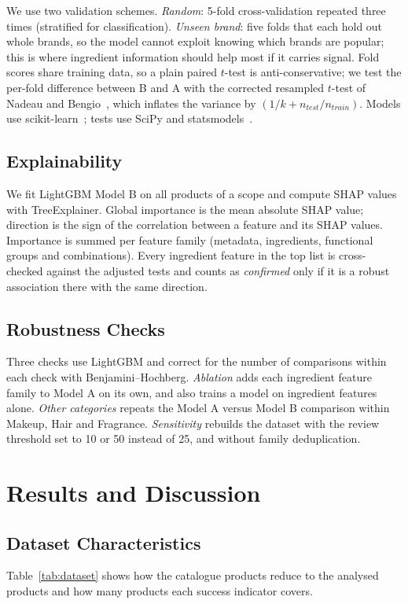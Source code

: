 \documentclass[11pt,a4paper]{article}
\newcommand{\draft}[1]{{\color{blue!70!black}#1}}
\begin{document}
We use two validation schemes. \emph{Random}: 5-fold cross-validation repeated three times (stratified for classification). \emph{Unseen brand}: five folds that each hold out whole brands, so the model cannot exploit knowing which brands are popular; this is where ingredient information should help most if it carries signal. Fold scores share training data, so a plain paired $t$-test is anti-conservative; we test the per-fold difference between B and A with the corrected resampled $t$-test of Nadeau and Bengio~\cite{nadeau2003}, which inflates the variance by $(1/k + n_{test}/n_{train})$. Models use scikit-learn~\cite{pedregosa2011sklearn}; tests use SciPy and statsmodels~\cite{seabold2010statsmodels}.

\subsection{Explainability}
We fit LightGBM Model B on all products of a scope and compute SHAP values~\cite{lundberg2017shap} with TreeExplainer. Global importance is the mean absolute SHAP value; direction is the sign of the correlation between a feature and its SHAP values. Importance is summed per feature family (metadata, ingredients, functional groups and combinations). Every ingredient feature in the top list is cross-checked against the adjusted tests and counts as \emph{confirmed} only if it is a robust association there with the same direction.

\subsection{Robustness Checks}
\draft{Three checks use LightGBM and correct for the number of comparisons within each check with Benjamini--Hochberg. \emph{Ablation} adds each ingredient feature family to Model A on its own, and also trains a model on ingredient features alone. \emph{Other categories} repeats the Model A versus Model B comparison within Makeup, Hair and Fragrance. \emph{Sensitivity} rebuilds the dataset with the review threshold set to 10 or 50 instead of 25, and without family deduplication.}

\section{Results and Discussion}

\subsection{Dataset Characteristics}
Table~\ref{tab:dataset} shows how the \NCatalogue{} catalogue products reduce to the \NAnalysed{} analysed products and how many products each success indicator covers.
\end{document}
